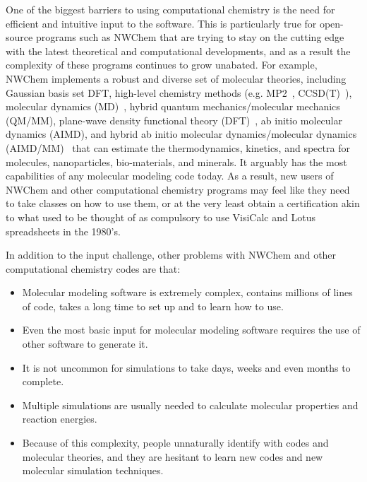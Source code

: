 \documentclass[runningheads,a4paper]{llncs}
\begin{document}
One of the biggest barriers to using computational chemistry is the need for efficient and intuitive input to the software.   This is particularly true for open-source programs such as NWChem that are trying to stay on the cutting edge with the latest theoretical and computational developments, and as a result the complexity of these programs continues to grow unabated. For example, NWChem implements a robust and diverse set of molecular theories, including Gaussian basis set DFT, high-level chemistry methods (e.g. MP2~\cite{moller1934note}, CCSD(T)~\cite{bartlett1994applications,bartlett2007coupled}), molecular dynamics (MD)~\cite{allen2017computer}, hybrid quantum mechanics/molecular mechanics (QM/MM), plane-wave density functional theory (DFT)~\cite{bylaska2017plane}, ab initio molecular dynamics (AIMD), and hybrid ab initio molecular dynamics/molecular dynamics (AIMD/MM)~\cite{laio2002hamiltonian,cauet2010structure} that can estimate the thermodynamics, kinetics, and spectra for molecules, nanoparticles, bio-materials, and minerals.  It arguably has the most capabilities of any molecular modeling code today.  As a result, new users of NWChem and other computational chemistry programs may feel like they need to take classes on how to use them, or at the very least obtain a certification akin to what used to be thought of as compulsory to use VisiCalc and Lotus spreadsheets in the 1980's.  

In addition to the input challenge, other problems with NWChem and other computational chemistry codes are that:
\begin{itemize}
\item Molecular modeling software is extremely complex, contains millions of lines of code, takes a long time to set up and to learn how to use. 
\item Even the most basic input for molecular modeling software requires the use of other software to generate it.
\item It is not uncommon for simulations to take days, weeks and even months to complete.
\item Multiple simulations are usually needed to calculate molecular properties and reaction energies. 
\item Because of this complexity, people unnaturally identify with codes and molecular theories, and they are hesitant to learn new codes and new molecular simulation techniques. 
\end{itemize}
\end{document}
